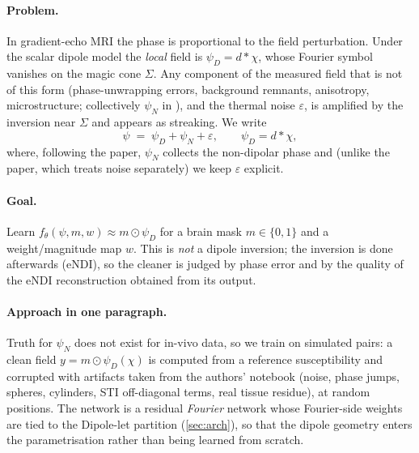 \documentclass[11pt]{article}
\theoremstyle{remark}
\begin{document}
\paragraph{Problem.}
In gradient-echo MRI the phase is proportional to the field perturbation. Under the scalar dipole model the \emph{local} field is
$\psi_D=d*\chi$, whose Fourier symbol vanishes on the magic cone $\Sigma$. Any component of the measured field that is not of this form
(phase-unwrapping errors, background remnants, anisotropy, microstructure; collectively $\psi_N$ in \cite{dipolelets}), and the thermal noise $\varepsilon$,
is amplified by the inversion near $\Sigma$ and appears as streaking. We write
\begin{equation}\label{eq:model}
\psi \;=\; \psi_D+\psi_N+\varepsilon,\qquad \psi_D=d*\chi,
\end{equation}
where, following the paper, $\psi_N$ collects the non-dipolar phase and (unlike the paper, which treats noise separately) we keep $\varepsilon$ explicit.

\paragraph{Goal.}
Learn $f_\theta(\psi,m,w)\approx m\odot\psi_D$ for a brain mask $m\in\{0,1\}$ and a weight/magnitude map $w$.
This is \emph{not} a dipole inversion; the inversion is done afterwards (eNDI), so the cleaner is judged by phase error and by the quality of the
eNDI reconstruction obtained from its output.

\paragraph{Approach in one paragraph.}
Truth for $\psi_N$ does not exist for in-vivo data, so we train on simulated pairs: a clean field $y=m\odot\psi_D(\chi)$ is computed from a reference susceptibility
and corrupted with artifacts taken from the authors' notebook (noise, phase jumps, spheres, cylinders, STI off-diagonal terms, real tissue residue), at random positions.
The network is a residual \emph{Fourier} network whose Fourier-side weights are tied to the Dipole-let partition (\cref{sec:arch}), so that the dipole geometry enters
the parametrisation rather than being learned from scratch.
\end{document}

